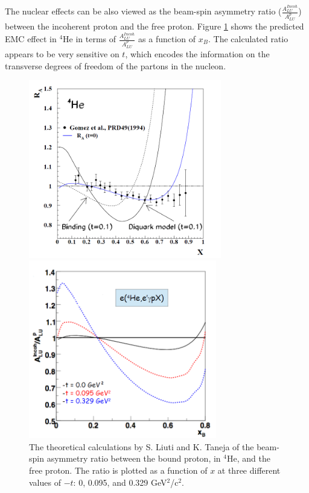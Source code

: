 The nuclear effects can be also viewed as the beam-spin asymmetry ratio ($\frac{A^{Incoh}_{LU}}{A^{p}_{LU}}$) between the incoherent proton and the free proton. Figure \ref{fig:EMC_Simonetta} shows the predicted EMC effect in $^4$He in terms of $\frac{A^{Incoh}_{LU}}{A^{p}_{LU}}$ as a function of $x_B$. The calculated ratio appears to be very sensitive on $t$, which encodes the information on the transverse degrees of freedom of the partons in the nucleon.

\begin{figure}[tbp]
\begin{minipage}[c]{.46\linewidth}
\includegraphics[height=7.8cm]{fig/4HeEMC_RA.png}
\caption{The EMC effect in $^4$He. The data points are the $^4$He EMC ratios \cite{He4_DIS_data}. The black dotted and solid curves are theoretical calculations based on a binding and a diquark model respectively, at $-t$= 0.1 GeV$^2$/c$^2$. The blue curve shows the theoretical calculation at the forward limit by Liuti and Taneja \cite{EMC_simonetta}.} 
\label{fig:4HeEMC_RA}
\end{minipage} \hfill
\begin{minipage}[c]{.46\linewidth}
\hspace{-0.3in}
\includegraphics[height=7.8cm]{fig/EMC_ALU_simonetta.png}
\caption{The theoretical calculations by S. Liuti and K. Taneja \cite{EMC_simonetta} of the beam-spin asymmetry ratio between the bound proton, in $^4$He, and the free proton. The ratio is plotted as a function of $x$ at three different values of $-t$: 0, 0.095, and 0.329 GeV$^2$/c$^2$.}
\label{fig:EMC_Simonetta}
\vspace{+0.2in}
\end{minipage}
\end{figure}


